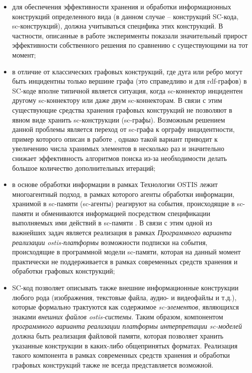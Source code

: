 \begin{itemize}
    \item для обеспечения эффективности хранения и обработки информационных конструкций определенного вида (в данном
    случае -- конструкций SC-кода, sc-конструкций), должна учитываться специфика этих конструкций. В частности,
    описанные в работе  эксперименты показали значительный прирост эффективности собственного
    решения по сравнению с существующими на тот момент;
    \item в отличие от классических графовых конструкций, где дуга или ребро могут быть инцидентны только вершине графа
    (это справедливо и для rdf-графов) в SC-коде вполне типичной является ситуация, когда sc-коннектор инцидентен
    другому sc-коннектору или даже двум sc-коннекторам. В связи с этим существующие средства хранения графовых
    конструкций не позволяют в явном виде хранить sc-конструкции (sc-графы). Возможным решением данной проблемы является
    переход от sc-графа к орграфу инцидентности, пример которого описан в работе , однако такой
    вариант приводит к увеличению числа хранимых элементов в несколько раз и значительно снижает эффективность алгоритмов
    поиска из-за необходимости делать большое количество дополнительных итераций;
    \item в основе обработки информации в рамках Технологии OSTIS лежит многоагентный подход, в рамках которого агенты
    обработки информации, хранимой в sc-памяти (sc-агенты) реагируют на события, происходящие в sc-памяти и обмениваются
    информацией посредством спецификации выполняемых ими действий в sc-памяти . В связи с этим
    одной из важнейших задач является реализация в рамках \textit{Программного варианта реализации ostis-платформы}
    возможности подписки на события, происходящие в программной модели sc-памяти, которая на данный момент практически
    не поддерживается в рамках современных средств хранения и обработки графовых конструкций;
    \item SC-код позволяет описывать также внешние информационные конструкции любого рода (изображения, текстовые файла,
    аудио- и видеофайлы и т.д.), которые формально трактуются как содержимое \textit{sc-элементов}, являющихся знаками
    \textit{внешних файлов ostis-системы}. Таким образом, компонентом \textit{программного варианта реализации платформы
    интерпретации sc-моделей} должна быть реализация файловой памяти, которая позволяет хранить указанные конструкции в
    каких-либо общепринятых форматах. Реализация такого компонента в рамках современных средств хранения и обработки
    графовых конструкций также не всегда представляется возможной.
\end{itemize}

